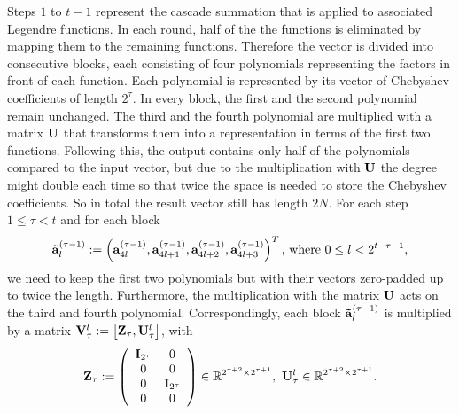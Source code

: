 Steps $1$ to $t-1$ represent the cascade summation that is applied to associated Legendre functions. In each round, half of the the functions is eliminated by mapping them to the remaining functions. Therefore the vector is divided into consecutive blocks, each consisting of four polynomials representing the factors in front of each function. Each polynomial is represented by its vector of Chebyshev coefficients of length $2^{\tau}$. In every block, the first and the second polynomial remain unchanged. The third and the fourth polynomial are multiplied with a matrix $\mathbf{U}$ that transforms them into a representation in terms of the first two functions. Following this, the output contains only half of the polynomials compared to the input vector, but due to the multiplication with $\mathbf{U}$ the degree might double each time so that twice the space is needed to store the Chebyshev coefficients. So in total the result vector still has length $2N$. For each step $1 \le \tau < t$ and for each block $$\mathbf{\tilde{a}}_{l}^{(\tau-1)} := \left(\mathbf{a}_{4l}^{(\tau-1)},\mathbf{a}_{4l+1}^{(\tau-1)},\mathbf{a}_{4l+2}^{(\tau-1)},\mathbf{a}_{4l+3}^{(\tau-1)}\right)^T \text{, where } 0 \le l < 2^{t-\tau-1},$$ we need to keep the first two polynomials but with their vectors zero-padded up to twice the length. Furthermore, the multiplication with the matrix $\mathbf{U}$ acts on the third and fourth polynomial.
Correspondingly, each block $\mathbf{\tilde{a}}_{l}^{(\tau-1)}$ is multiplied by a matrix $\mathbf{V}_{\tau}^l := \left[\mathbf{Z_{\tau}},\mathbf{U}_{\tau}^l\right]$, with
$$\mb{Z}_{\tau} := \left(\begin{array}{cccc} \mb{I}_{2^{\tau}} & 0\\ 0 & 0 \\ 0 & \mb{I}_{2^{\tau}} \\ 0 & 0 \end{array}\right) \in \R^{2^{\tau+2} \times 2^{\tau+1}},\ \mb{U}_{\tau}^l \in \R^{2^{\tau+2} \times 2^{\tau+1}}.$$
